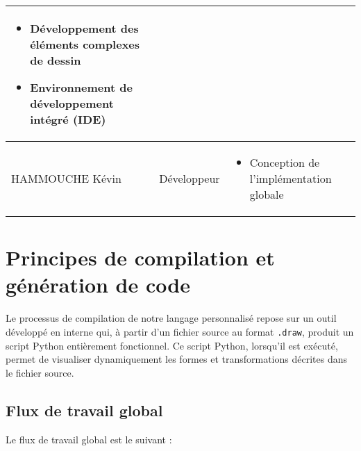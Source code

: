 \documentclass[12pt,a4paper]{article}
\begin{document}
\begin{center}
\begin{tabular}{|l|l|p{8cm}|}
        \begin{itemize}[noitemsep, left=0pt]
            \item Développement des éléments complexes de dessin
            \item Environnement de développement intégré (IDE)
        \end{itemize} \\ \hline
        HAMMOUCHE Kévin          & Développeur      & 
        \begin{itemize}[noitemsep, left=0pt]
            \item Conception de l’implémentation globale
        \end{itemize} \\ \hline
    \end{tabular}
\end{center}

\newpage
\section{Principes de compilation et génération de code}

Le processus de compilation de notre langage personnalisé repose sur un outil développé en interne qui, à partir d’un fichier source au format \texttt{.draw}, produit un script Python entièrement fonctionnel. Ce script Python, lorsqu’il est exécuté, permet de visualiser dynamiquement les formes et transformations décrites dans le fichier source.

\subsection{Flux de travail global}

Le flux de travail global est le suivant :
\end{document}
